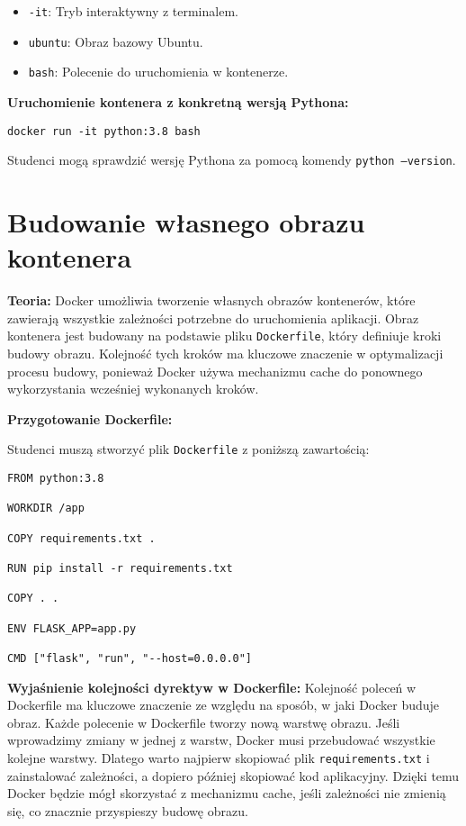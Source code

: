 \documentclass{article}
\begin{document}
\begin{itemize}
    \item \texttt{-it}: Tryb interaktywny z terminalem.
    \item \texttt{ubuntu}: Obraz bazowy Ubuntu.
    \item \texttt{bash}: Polecenie do uruchomienia w kontenerze.
\end{itemize}

\textbf{Uruchomienie kontenera z konkretną wersją Pythona:}

\noindent\begin{lstlisting}
docker run -it python:3.8 bash
\end{lstlisting}

Studenci mogą sprawdzić wersję Pythona za pomocą komendy \texttt{python --version}.

\section{Budowanie własnego obrazu kontenera}

\textbf{Teoria:}  
Docker umożliwia tworzenie własnych obrazów kontenerów, które zawierają wszystkie zależności potrzebne do uruchomienia aplikacji. Obraz kontenera jest budowany na podstawie pliku \texttt{Dockerfile}, który definiuje kroki budowy obrazu. Kolejność tych kroków ma kluczowe znaczenie w optymalizacji procesu budowy, ponieważ Docker używa mechanizmu cache do ponownego wykorzystania wcześniej wykonanych kroków.

\textbf{Przygotowanie Dockerfile:}

Studenci muszą stworzyć plik \texttt{Dockerfile} z poniższą zawartością:

\noindent\begin{lstlisting}
FROM python:3.8

WORKDIR /app

COPY requirements.txt .

RUN pip install -r requirements.txt

COPY . .

ENV FLASK_APP=app.py

CMD ["flask", "run", "--host=0.0.0.0"]
\end{lstlisting}

\textbf{Wyjaśnienie kolejności dyrektyw w Dockerfile:}  
Kolejność poleceń w Dockerfile ma kluczowe znaczenie ze względu na sposób, w jaki Docker buduje obraz. Każde polecenie w Dockerfile tworzy nową warstwę obrazu. Jeśli wprowadzimy zmiany w jednej z warstw, Docker musi przebudować wszystkie kolejne warstwy. Dlatego warto najpierw skopiować plik \texttt{requirements.txt} i zainstalować zależności, a dopiero później skopiować kod aplikacyjny. Dzięki temu Docker będzie mógł skorzystać z mechanizmu cache, jeśli zależności nie zmienią się, co znacznie przyspieszy budowę obrazu.
\end{document}
